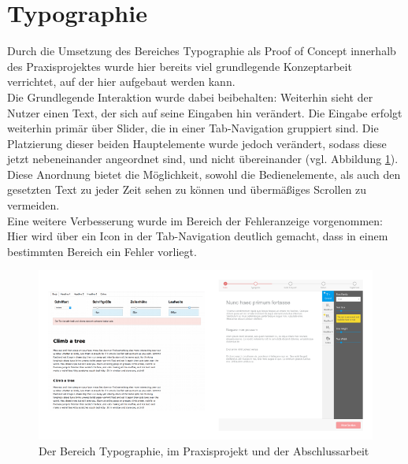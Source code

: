 
\section{Typographie}
Durch die Umsetzung des Bereiches Typographie als Proof of Concept innerhalb des Praxisprojektes wurde hier bereits viel grundlegende Konzeptarbeit verrichtet, auf der hier aufgebaut werden kann.\\
Die Grundlegende Interaktion wurde dabei beibehalten: Weiterhin sieht der Nutzer einen Text, der sich auf seine Eingaben hin verändert. Die Eingabe erfolgt weiterhin primär über Slider, die in einer Tab-Navigation gruppiert sind. Die Platzierung dieser beiden Hauptelemente wurde jedoch verändert, sodass diese jetzt nebeneinander angeordnet sind, und nicht übereinander (vgl. Abbildung \ref{fig:vgl_poc_ba}). Diese Anordnung bietet die Möglichkeit, sowohl die Bedienelemente, als auch den gesetzten Text zu jeder Zeit sehen zu können und übermäßiges Scrollen zu vermeiden.\\
Eine weitere Verbesserung wurde im Bereich der Fehleranzeige vorgenommen: Hier wird über ein Icon in der Tab-Navigation deutlich gemacht, dass in einem bestimmten Bereich ein Fehler vorliegt.

\begin{figure}[h]
    \centering
    \includegraphics[width=1\textwidth]{images/vergleich_PoC_BA.png}
    \caption{Der Bereich Typographie, im Praxisprojekt und der Abschlussarbeit}
    \label{fig:vgl_poc_ba}
\end{figure}

